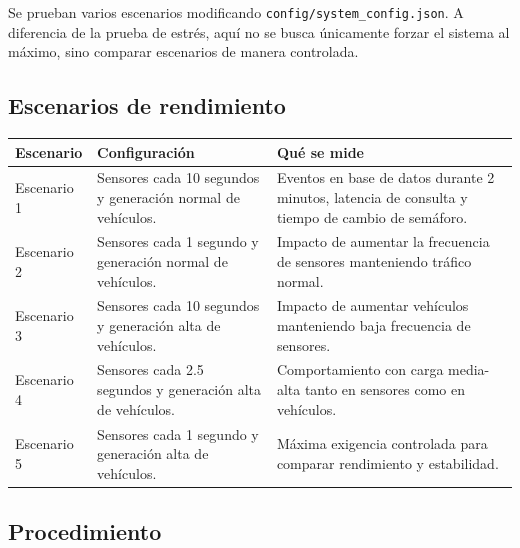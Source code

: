 \documentclass[12pt, a4paper]{article}
\begin{document}
Se prueban varios escenarios modificando \texttt{config/system\_config.json}. A diferencia de la prueba de estrés, aquí no se busca únicamente forzar el sistema al máximo, sino comparar escenarios de manera controlada.

\subsection{Escenarios de rendimiento}

\begin{longtable}{|p{3.2cm}|p{4.2cm}|p{5.7cm}|}
\hline
\rowcolor{gray!20}
\textbf{Escenario} & \textbf{Configuración} & \textbf{Qué se mide} \\
\hline
Escenario 1 &
Sensores cada 10 segundos y generación normal de vehículos. &
Eventos en base de datos durante 2 minutos, latencia de consulta y tiempo de cambio de semáforo. \\
\hline
Escenario 2 &
Sensores cada 1 segundo y generación normal de vehículos. &
Impacto de aumentar la frecuencia de sensores manteniendo tráfico normal. \\
\hline
Escenario 3 &
Sensores cada 10 segundos y generación alta de vehículos. &
Impacto de aumentar vehículos manteniendo baja frecuencia de sensores. \\
\hline
Escenario 4 &
Sensores cada 2.5 segundos y generación alta de vehículos. &
Comportamiento con carga media-alta tanto en sensores como en vehículos. \\
\hline
Escenario 5 &
Sensores cada 1 segundo y generación alta de vehículos. &
Máxima exigencia controlada para comparar rendimiento y estabilidad. \\
\hline
\end{longtable}

\subsection{Procedimiento}
\end{document}
